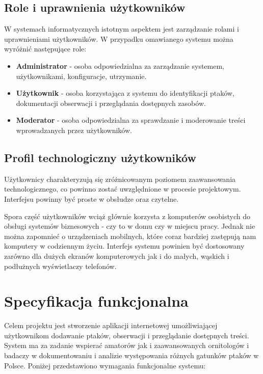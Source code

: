 \subsection{Role i uprawnienia użytkowników}

W systemach informatycznych istotnym aspektem jest zarządzanie rolami i uprawnieniami użytkowników. W przypadku omawianego systemu można wyróżnić następujące role:
\begin{itemize}
	\item \textbf{Administrator} - osoba odpowiedzialna za zarządzanie systemem, użytkownikami, konfiguracje, utrzymanie.
	\item \textbf{Użytkownik} - osoba korzystająca z systemu do identyfikacji ptaków, dokumentacji obserwacji i przeglądania dostępnych zasobów.
	\item \textbf{Moderator} - osoba odpowiedzialna za sprawdzanie i moderowanie treści wprowadzanych przez użytkowników.
\end{itemize}

\subsection{Profil technologiczny użytkowników}

Użytkownicy charakteryzują się zróżnicowanym poziomem zaawansowania technologicznego, co powinno zostać uwzględnione w procesie projektowym. Interfejsu powinny być proste w obsłudze oraz czytelne.

Spora część użytkowników wciąż głównie korzysta z komputerów osobistych do obsługi systemów biznesowych - czy to w domu czy w miejscu pracy. Jednak nie można zapomnieć o urządzeniach mobilnych, które coraz bardziej zastępują nam komputery w codziennym życiu. Interfejs systemu powinien być dostosowany zarówno dla dużych ekranów komputerowych jak i do małych, wąskich i podłużnych wyświetlaczy telefonów.

\section{Specyfikacja funkcjonalna}

Celem projektu jest stworzenie aplikacji internetowej umożliwiającej użytkownikom dodawanie ptaków, obserwacji i przeglądanie dostępnych treści. System ma za zadanie wspierać amatorów jak i zaawansowanych ornitologów i badaczy w dokumentowaniu i analizie występowania różnych gatunków ptaków w Polsce.
Poniżej przedstawiono wymagania funkcjonalne systemu:


